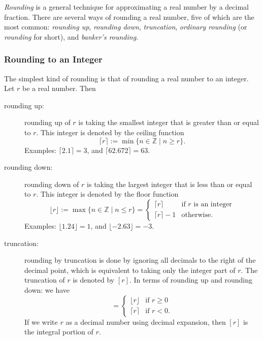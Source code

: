 \documentclass[12pt]{article}
\begin{document}
\emph{Rounding} is a general technique for approximating a real number by a decimal fraction.  There are several ways of rounding a real number, five of which are the most common: \emph{rounding up}, \emph{rounding down}, \emph{truncation}, \emph{ordinary rounding} (or \emph{rounding} for short), and \emph{banker's rounding}.

\subsubsection*{Rounding to an Integer}

The simplest kind of rounding is that of rounding a real number to an integer.  Let $r$ be a real number.  Then
\begin{description}
\item[rounding up:] rounding up of $r$ is taking the smallest integer that is greater than or equal to $r$.  This integer is denoted by the ceiling function $$\lceil r \rceil:=\min\lbrace n\in \mathbb{Z}\mid n\ge r \rbrace.$$  Examples: $\lceil 2.1 \rceil = 3$, and $\lceil 62.672 \rceil=63$.
\item[rounding down:] rounding down of $r$ is taking the largest integer that is less than or equal to $r$.  This integer is denoted by the floor function 
\begin{displaymath}
\lfloor r \rfloor:=\max\lbrace n\in \mathbb{Z}\mid n\le r\rbrace = \left\{
\begin{array}{ll}
\lceil r \rceil & \textrm{if $r$ is an integer}\\
\lceil r\rceil - 1 & \textrm{otherwise.}
\end{array}
\right.
\end{displaymath}
Examples: $\lfloor 1.24 \rfloor = 1$, and $\lfloor -2.63 \rfloor = -3$.  
\item[truncation:] rounding by truncation is done by ignoring all decimals to the right of the decimal point, which is equivalent to taking only the integer part of $r$.  The truncation of $r$ is denoted by $[r]$.  In terms of rounding up and rounding down: we have
\begin{displaymath}
[r] = \left\{
\begin{array}{ll}
\lfloor r \rfloor & \textrm{if $r\ge 0$}\\
\lceil r \rceil & \textrm{if $r< 0.$}
\end{array}
\right.
\end{displaymath}
If we write $r$ as a decimal number using decimal expansion, then $[r]$ is the integral portion of $r$.


\end{description}
\end{document}
